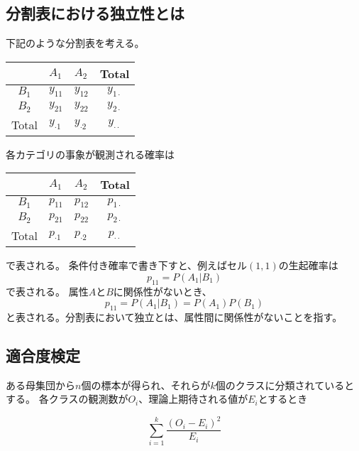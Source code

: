 \documentclass[10pt, a4paper]{ltjsarticle}
\begin{document}


\subsection{分割表における独立性とは}

下記のような分割表を考える。

\begin{table}[h]
  \centering
  \begin{tabular}{c|ll|c}
   &  $A_1$ & $A_2$ & Total \\ \hline
 $B_1$  & $y_{11}$ & $y_{12}$  & $y_{1\cdot}$ \\
 $B_2$  & $y_{21}$ & $y_{22}$  & $y_{2\cdot}$ \\ \hline
 Total  & $y_{\cdot 1}$ & $y_{\cdot 2}$ & $y_{\cdot\cdot}$ 
  \end{tabular}
\end{table}

各カテゴリの事象が観測される確率は
\begin{table}[h]
  \centering
  \begin{tabular}{c|ll|c}
   &  $A_1$ & $A_2$ & Total \\ \hline
 $B_1$  & $p_{11}$ & $p_{12}$  & $p_{1\cdot}$ \\
 $B_2$  & $p_{21}$ & $p_{22}$  & $p_{2\cdot}$ \\ \hline
 Total  & $p_{\cdot 1}$ & $p_{\cdot 2}$ & $p_{\cdot\cdot}$ 
  \end{tabular}
\end{table}
で表される。
条件付き確率で書き下すと、例えばセル$(1,1)$の生起確率は
\begin{equation}
  p_{11} = P(A_1|B_1)
\end{equation}
で表される。 属性$A$と$B$に関係性がないとき、
\begin{equation}
  p_{11} = P(A_1|B_1) = P(A_1)P(B_1)
\end{equation}
と表される。分割表において独立とは、属性間に関係性がないことを指す。


\subsection{適合度検定}

ある母集団から$n$個の標本が得られ、それらが$k$個のクラスに分類されているとする。
各クラスの観測数が$O_i$、理論上期待される値が$E_i$とするとき

\begin{equation}
  \sum_{i=1}^k \frac{(O_i-E_i)^2}{E_i}
\end{equation}
\end{document}
